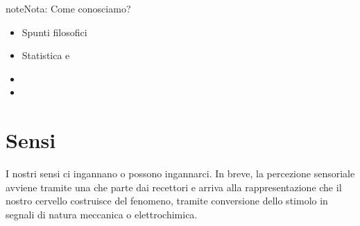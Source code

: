 \documentclass[letterpaper,10pt,italian]{jupyterBook}
\begin{document}
\begin{sphinxadmonition}{note}{Nota:}
\sphinxAtStartPar
Come conosciamo?
\begin{itemize}
\item {} 
\sphinxAtStartPar
Spunti filosofici

\item {} 
\sphinxAtStartPar
Statistica e 

\end{itemize}
\end{sphinxadmonition}

\sphinxAtStartPar
{}
\begin{itemize}
\item {} 
\sphinxAtStartPar
{}

\item {} 
\sphinxAtStartPar
{}

\end{itemize}

\sphinxstepscope


\chapter{Sensi}
\label{\detokenize{ch/intro/sensing:sensi}}\label{\detokenize{ch/intro/sensing:physics-hs-intro-sensing}}\label{\detokenize{ch/intro/sensing::doc}}
\sphinxAtStartPar
I nostri sensi ci ingannano o possono ingannarci. In breve, la percezione sensoriale avviene tramite una  che parte dai recettori e arriva alla rappresentazione che il nostro cervello costruisce del fenomeno, tramite conversione dello stimolo in segnali di natura meccanica o elettro\sphinxhyphen{}chimica.
\end{document}
